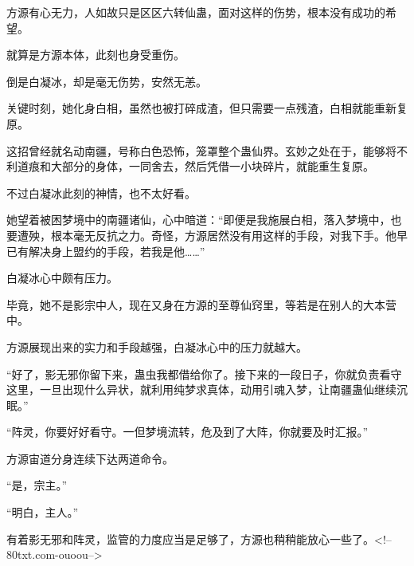 \begin{this_body}
方源有心无力，人如故只是区区六转仙蛊，面对这样的伤势，根本没有成功的希望。

就算是方源本体，此刻也身受重伤。

倒是白凝冰，却是毫无伤势，安然无恙。

关键时刻，她化身白相，虽然也被打碎成渣，但只需要一点残渣，白相就能重新复原。

这招曾经就名动南疆，号称白色恐怖，笼罩整个蛊仙界。玄妙之处在于，能够将不利道痕和大部分的身体，一同舍去，然后凭借一小块碎片，就能重生复原。

不过白凝冰此刻的神情，也不太好看。

她望着被困梦境中的南疆诸仙，心中暗道：“即便是我施展白相，落入梦境中，也要遭殃，根本毫无反抗之力。奇怪，方源居然没有用这样的手段，对我下手。他早已有解决身上盟约的手段，若我是他……”

白凝冰心中颇有压力。

毕竟，她不是影宗中人，现在又身在方源的至尊仙窍里，等若是在别人的大本营中。

方源展现出来的实力和手段越强，白凝冰心中的压力就越大。

“好了，影无邪你留下来，蛊虫我都借给你了。接下来的一段日子，你就负责看守这里，一旦出现什么异状，就利用纯梦求真体，动用引魂入梦，让南疆蛊仙继续沉眠。”

“阵灵，你要好好看守。一但梦境流转，危及到了大阵，你就要及时汇报。”

方源宙道分身连续下达两道命令。

“是，宗主。”

“明白，主人。”

有着影无邪和阵灵，监管的力度应当是足够了，方源也稍稍能放心一些了。<!--80txt.com-ouoou-->

\end{this_body}

